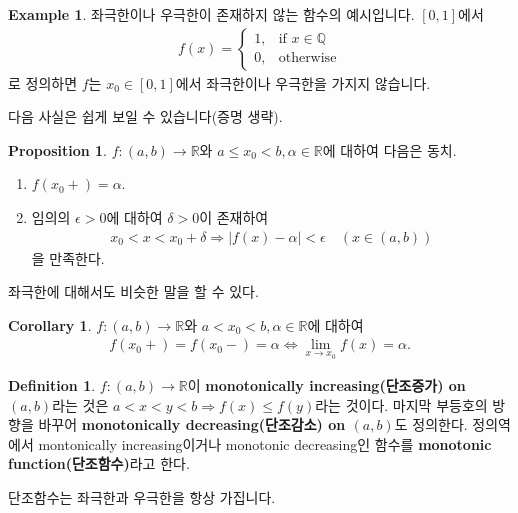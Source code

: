 \documentclass[12pt]{article}
\theoremstyle{definition}
\newtheorem{cor}[thm]{Corollary}
\newtheorem{prop}[thm]{Proposition}
\newtheorem{defn}[thm]{Definition}
\newtheorem*{ex}{Example}
\def\RR{\mathbb{R}}
\def\eps{\epsilon}
\newcommand{\abs}[1]{\left\vert#1\right\vert}
\begin{document}
\begin{ex} 좌극한이나 우극한이 존재하지 않는 함수의 예시입니다. \([0, 1]\)에서
	\begin{gather*}
		f(x)=
		\begin{cases}
			1, &\text{if } x \in \mathbb{Q}\\
			0, &\text{otherwise}
		\end{cases}
	\end{gather*}
	로 정의하면 \(f\)는 \(x_0 \in [0, 1]\)에서 좌극한이나 우극한을 가지지 않습니다.
\end{ex}

다음 사실은 쉽게 보일 수 있습니다(증명 생략).

\begin{prop}
	\(f: (a, b) \rightarrow \RR\)와 \(a \le x_0 < b, \alpha \in \RR\)에 대하여 다음은 동치.
	\begin{enumerate} [label=(\alph*), leftmargin=2\parindent]
		\item
		\(f(x_0+) = \alpha\).
		\item
		임의의 \(\eps > 0\)에 대하여 \(\delta > 0\)이 존재하여
		\begin{gather*}
			x_0 < x < x_0 + \delta \Longrightarrow \abs{f(x) - \alpha} < \eps \quad (x \in (a, b))
		\end{gather*}
		을 만족한다.
	\end{enumerate}
	좌극한에 대해서도 비슷한 말을 할 수 있다.
\end{prop}

\begin{cor}
	\(f: (a, b) \rightarrow \RR\)와 \(a < x_0 < b, \alpha \in \RR\)에 대하여
	\begin{gather*}
		f(x_0+) = f(x_0-) = \alpha \iff \lim_{x \rightarrow x_0} f(x) = \alpha.
	\end{gather*}
\end{cor}

\begin{defn}
	\(f: (a, b) \rightarrow \RR\)이 \textbf{monotonically increasing(단조증가) on \((a, b)\)}라는 것은 \(a < x < y < b \Longrightarrow f(x) \le f(y)\)라는 것이다. 마지막 부등호의 방향을 바꾸어 \textbf{monotonically decreasing(단조감소) on \((a, b)\)}도 정의한다. 정의역에서 montonically increasing이거나 monotonic decreasing인 함수를 \textbf{monotonic function(단조함수)}라고 한다.
\end{defn}

단조함수는 좌극한과 우극한을 항상 가집니다.
\end{document}
